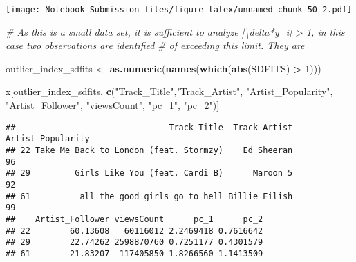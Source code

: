 \documentclass[
]{article}
\newenvironment{Shaded}{\begin{snugshade}}{\end{snugshade}}
\newcommand{\CommentTok}[1]{\textcolor[rgb]{0.56,0.35,0.01}{\textit{#1}}}
\newcommand{\DataTypeTok}[1]{\textcolor[rgb]{0.13,0.29,0.53}{#1}}
\newcommand{\DecValTok}[1]{\textcolor[rgb]{0.00,0.00,0.81}{#1}}
\newcommand{\KeywordTok}[1]{\textcolor[rgb]{0.13,0.29,0.53}{\textbf{#1}}}
\newcommand{\NormalTok}[1]{#1}
\newcommand{\OperatorTok}[1]{\textcolor[rgb]{0.81,0.36,0.00}{\textbf{#1}}}
\newcommand{\StringTok}[1]{\textcolor[rgb]{0.31,0.60,0.02}{#1}}
\begin{document}
\begin{Shaded}
\end{Shaded}

\texttt{[image: Notebook\_Submission\_files/figure-latex/unnamed-chunk-50-2.pdf]}

\begin{Shaded}
\begin{Highlighting}[]
\CommentTok{# As this is a small data set, it is sufficient to analyze |\textbackslash{}delta*y_i| > 1, in this case two observations are identified}
\CommentTok{# of exceeding this limit. They are}

\NormalTok{outlier_index_sdfits <-}\StringTok{ }\KeywordTok{as.numeric}\NormalTok{(}\KeywordTok{names}\NormalTok{(}\KeywordTok{which}\NormalTok{(}\KeywordTok{abs}\NormalTok{(SDFITS) }\OperatorTok{>}\StringTok{ }\DecValTok{1}\NormalTok{))) }

\NormalTok{x[outlier_index_sdfits, }\KeywordTok{c}\NormalTok{(}\StringTok{"Track_Title"}\NormalTok{,}\StringTok{"Track_Artist"}\NormalTok{, }\StringTok{"Artist_Popularity"}\NormalTok{, }\StringTok{"Artist_Follower"}\NormalTok{, }\StringTok{"viewsCount"}\NormalTok{, }\StringTok{"pc_1"}\NormalTok{,}
                          \StringTok{"pc_2"}\NormalTok{)]}
\end{Highlighting}
\end{Shaded}

\begin{verbatim}
##                               Track_Title  Track_Artist Artist_Popularity
## 22 Take Me Back to London (feat. Stormzy)    Ed Sheeran                96
## 29         Girls Like You (feat. Cardi B)      Maroon 5                92
## 61          all the good girls go to hell Billie Eilish                99
##    Artist_Follower viewsCount      pc_1      pc_2
## 22        60.13608   60116012 2.2469418 0.7616642
## 29        22.74262 2598870760 0.7251177 0.4301579
## 61        21.83207  117405850 1.8266560 1.1413509
\end{verbatim}
\end{document}
